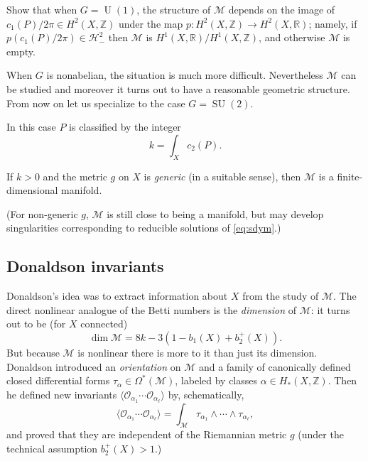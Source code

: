 \documentclass[12pt,letterpaper,reqno]{article}
\numberwithin{equation}{section}
\newcommand{\cM}{\ensuremath{\mathcal M}}
\newcommand{\cO}{\ensuremath{\mathcal O}}
\newcommand{\cH}{\ensuremath{\mathcal H}}
\newcommand{\R}{\ensuremath{\mathbb R}}
\newcommand{\Z}{\ensuremath{\mathbb Z}}
\newcommand{\IP}[1]{\langle#1\rangle}
\newcommand{\ti}[1]{\textit{#1}}
\DeclareMathOperator{\SU}{SU}
\DeclareMathOperator{\U}{U}
\newcommand{\fixme}[1]{{\color{orange}{[#1]}}}
\begin{document}
\begin{exercise}
Show that when $G = \U(1)$, the structure of $\cM$ depends on
the image of $c_1(P)/2\pi \in H^2(X,\Z)$ under the map
$p: H^2(X,\Z) \to H^2(X,\R)$; namely, if $p(c_1(P)/2\pi) \in \cH^2_-$
then $\cM$ is $H^1(X,\R) / H^1(X,\Z)$, and otherwise $\cM$ is empty.
\fixme{warning: needs Hodge theory}
\fixme{warning: I got this wrong twice already, hopefully it's right now}
\end{exercise}

When $G$ is nonabelian, the situation is much more difficult.
Nevertheless $\cM$ can be studied and moreover it turns out to have a 
reasonable geometric structure.
From now on let us specialize to the case $G = \SU(2)$.

In this case $P$ is classified by the integer
\begin{equation}
  k = \int_X c_2(P).
\end{equation}

\begin{fact}
If $k>0$ and the metric $g$ on $X$ is \ti{generic} (in a suitable sense), 
then $\cM$ is a finite-dimensional manifold.
\end{fact}
(For non-generic $g$, $\cM$ is still close to being a manifold, but 
may develop singularities corresponding
to reducible solutions of \eqref{eq:sdym}.)


\subsection{Donaldson invariants}

Donaldson's idea was to extract information about $X$ from
the study of $\cM$. The direct nonlinear analogue of the Betti numbers is the
\ti{dimension} of $\cM$: it turns out to be (for $X$ connected)
\begin{equation}
  \dim \cM = 8k - 3 (1 - b_1(X) + b_2^+(X)).
\end{equation}
But because $\cM$ is nonlinear there is more to it than just its dimension.
Donaldson introduced an \ti{orientation} on $\cM$
and a family of canonically defined
closed differential forms $\tau_\alpha \in \Omega^*(\cM)$,
labeled by classes $\alpha \in H_*(X,\Z)$.
Then he defined new invariants $\IP{\cO_{\alpha_1} \cdots \cO_{\alpha_\ell}}$
by, schematically,
\begin{equation} \label{eq:donaldson-integral}
  \IP{\cO_{\alpha_1} \cdots \cO_{\alpha_\ell}} = \int_\cM \tau_{\alpha_1} \wedge \cdots \wedge \tau_{\alpha_\ell},
\end{equation}
and proved that they are independent of the Riemannian metric
$g$ (under the technical
assumption $b_2^+(X) > 1$.)
\end{document}
